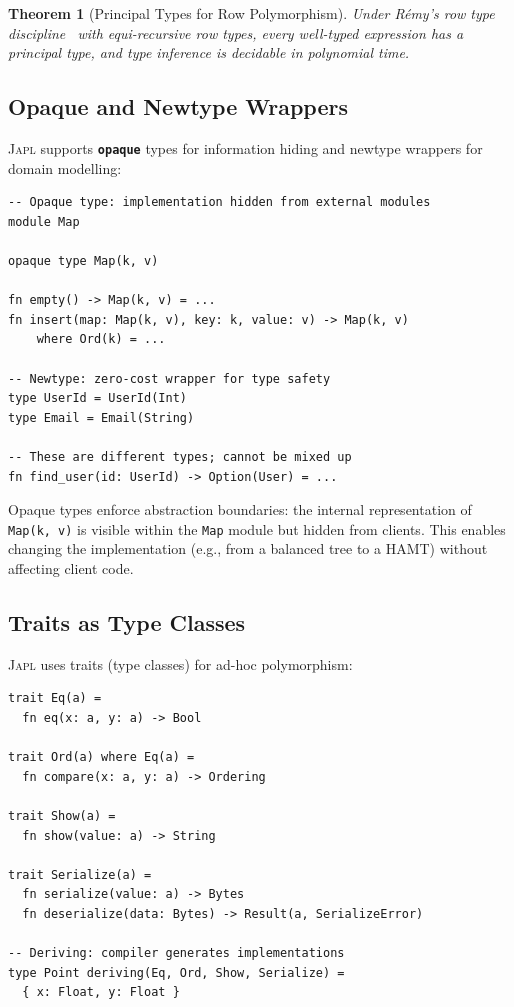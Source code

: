 \documentclass[11pt]{article}
\newtheorem{theorem}{Theorem}[section]
\theoremstyle{definition}
\theoremstyle{remark}
\newcommand{\japl}{\textsc{Japl}}
\newcommand{\keyword}[1]{\texttt{\textbf{#1}}}
\begin{document}
\begin{theorem}[Principal Types for Row Polymorphism]
\label{thm:row-principal}
Under R\'{e}my's row type discipline~\cite{remy1994type} with
equi-recursive row types, every well-typed expression has a principal
type, and type inference is decidable in polynomial time.
\end{theorem}

\subsection{Opaque and Newtype Wrappers}
\label{sec:type-system:opaque}

\japl{} supports \keyword{opaque} types for information hiding and
newtype wrappers for domain modelling:

\begin{lstlisting}[caption={Opaque types and newtypes.}]
-- Opaque type: implementation hidden from external modules
module Map

opaque type Map(k, v)

fn empty() -> Map(k, v) = ...
fn insert(map: Map(k, v), key: k, value: v) -> Map(k, v)
    where Ord(k) = ...

-- Newtype: zero-cost wrapper for type safety
type UserId = UserId(Int)
type Email = Email(String)

-- These are different types; cannot be mixed up
fn find_user(id: UserId) -> Option(User) = ...
\end{lstlisting}

Opaque types enforce abstraction boundaries: the internal
representation of \texttt{Map(k, v)} is visible within the
\texttt{Map} module but hidden from clients.  This enables changing
the implementation (e.g., from a balanced tree to a HAMT) without
affecting client code.

\subsection{Traits as Type Classes}
\label{sec:type-system:traits}

\japl{} uses traits (type classes) for ad-hoc polymorphism:

\begin{lstlisting}[caption={Traits in \japl{}.}]
trait Eq(a) =
  fn eq(x: a, y: a) -> Bool

trait Ord(a) where Eq(a) =
  fn compare(x: a, y: a) -> Ordering

trait Show(a) =
  fn show(value: a) -> String

trait Serialize(a) =
  fn serialize(value: a) -> Bytes
  fn deserialize(data: Bytes) -> Result(a, SerializeError)

-- Deriving: compiler generates implementations
type Point deriving(Eq, Ord, Show, Serialize) =
  { x: Float, y: Float }
\end{lstlisting}
\end{document}
